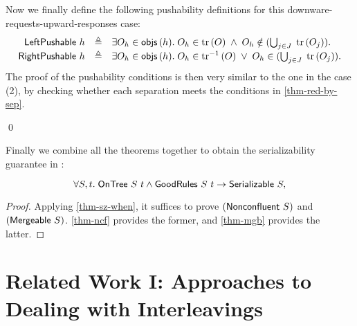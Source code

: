 Now we finally define the following pushability definitions for this downware-requests-upward-responses case:
\begin{displaymath}
  \renewcommand{\arraystretch}{1.2}
  \begin{array}{rcl}
    \mathsf{LeftPushable}\ h & \triangleq & \exists O_h \in \aobjs{h}.\; O_h \in \subtree{O} \;\wedge\; O_h \notin (\bigcup_{j \in J}\; \subtree{O_j}).\\
    \mathsf{RightPushable}\ h & \triangleq & \exists O_h \in \aobjs{h}.\; O_h \in \subtreec{O} \;\vee\; O_h \in (\bigcup_{j \in J}\; \subtree{O_j}).
  \end{array}
\end{displaymath}
The proof of the pushability conditions is then very similar to the one in the case (2), by checking whether each separation meets the conditions in \autoref{thm-red-by-sep}.

\renewcommand\qedsymbol{${\color{mygray}\textit{(End of the mergeability proof)}}\ \blacksquare$}
\qed{}
\renewcommand\qedsymbol{$\blacksquare$}

Finally we combine all the theorems together to obtain the serializability guarantee in \hemiola{}:
\begin{theorem}
  \begin{displaymath}
    \forall S, t.\; \mathsf{OnTree}\ S\ t \land \mathsf{GoodRules}\ S\ t \to \mathsf{Serializable}\ S,
  \end{displaymath}
  \vspace{-15pt}
  \label{thm-sz-guarantee}
\end{theorem}
\begin{proof}
  Applying \autoref{thm-sz-when}, it suffices to prove $(\mathsf{Nonconfluent}\ S)$ and $(\mathsf{Mergeable}\ S)$.
  \autoref{thm-ncf} provides the former, and \autoref{thm-mgb} provides the latter.
\end{proof}

\chapter{Related Work I: Approaches to Dealing with Interleavings}
\label{sec-related-work-i}
